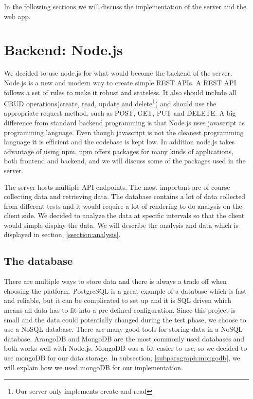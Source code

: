 \documentclass[USenglish]{ifimaster}  %
\begin{document}
In the following sections we will discuss the implementation of the server and the web app.

\section{Backend: Node.js}
We decided to use node.js for what would become the backend of the server. Node.js is a new and modern way to create simple REST APIs. A REST API follows a set of rules to make it robust and stateless. It also should include all CRUD operations(create, read, update and delete\footnote{Our server only implements create and read}) and should use the appropriate request method, such as POST, GET, PUT and DELETE. A big difference from standard backend programming is that Node.js uses javascript as programming language. Even though javascript is not the cleanest programming language it is efficient and the codebase is kept low. In addition node.js takes advantage of using \acrfull{npm}. \acrshort{npm} offers packages for many kinds of applications, both frontend and backend, and we will discuss some of the packages used in the server.

The server hosts multiple API endpoints. The most important are of course collecting data and retrieving data. The database contains a lot of data collected from different tests and it would require a lot of rendering to do analysis on the client side. We decided to analyze the data at specific intervals so that the client would simple display the data. We will describe the analysis and data which is displayed in section, \vref{ssection:analysis}.

\subsection{The database}
There are multiple ways to store data and there is always a trade off when choosing the platform. PostgreSQL is a great example of a database which is fast and reliable, but it can be complicated to set up and it is SQL driven which means all data has to fit into a pre-defined configuration. Since this project is small and the data could potentially changed during the test phase, we choose to use a NoSQL database. There are many good tools for storing data in a NoSQL database. ArangoDB and MongoDB are the most commonly used databases and both works well with Node.js. MongoDB was a bit easier to use, so we decided to use mongoDB for our data storage. In subsection, \vref{subparagraph:mongodb}, we will explain how we used mongoDB for our implementation.
\end{document}
